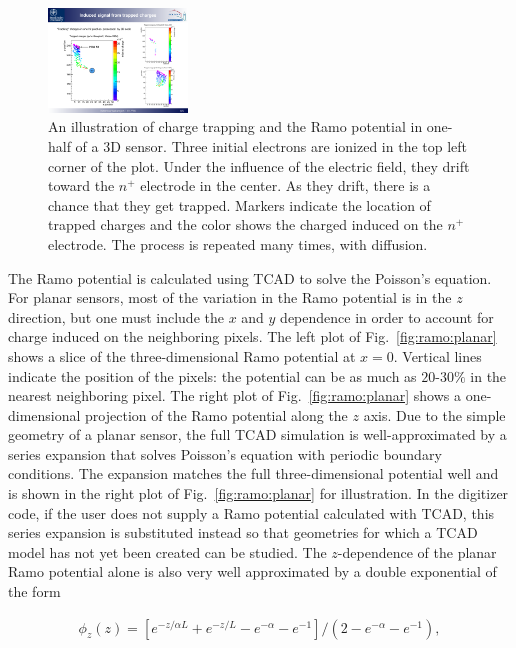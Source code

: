 \begin{figure}[!htpb]
\centering
\includegraphics[width=0.33\textwidth]{ramoschematic3D.pdf}
\caption{An illustration of charge trapping and the Ramo potential in one-half of a 3D sensor.  Three initial electrons are ionized in the top left corner of the plot.  Under the influence of the electric field, they drift toward the $n^+$ electrode in the center.  As they drift, there is a chance that they get trapped.  Markers indicate the location of trapped charges and the color shows the charged induced on the $n^+$ electrode.  The process is repeated many times, with diffusion.}
\label{fig:ramo:schematic}
\end{figure}

The Ramo potential is calculated using TCAD to solve the Poisson's equation.  For planar sensors, most of the variation in the Ramo potential is in the $z$ direction, but one must include the $x$ and $y$ dependence in order to account for charge induced on the neighboring pixels.  The left plot of Fig.~\ref{fig:ramo:planar} shows a slice of the three-dimensional Ramo potential at $x=0$.  Vertical lines indicate the position of the pixels: the potential can be as much as $20$-$30\%$ in the nearest neighboring pixel.  The right plot of Fig.~\ref{fig:ramo:planar} shows a one-dimensional projection of the Ramo potential along the $z$ axis.  Due to the simple geometry of a planar sensor, the full TCAD simulation is well-approximated by a series expansion that solves Poisson's equation with periodic boundary conditions.  The expansion matches the full three-dimensional potential well and is shown in the right plot of Fig.~\ref{fig:ramo:planar} for illustration.  In the digitizer code, if the user does not supply a Ramo potential calculated with TCAD, this series expansion is substituted instead so that geometries for which a TCAD model has not yet been created can be studied.  The $z$-dependence of the planar Ramo potential alone is also very well approximated by a double exponential of the form 

\begin{align}
\label{eq:doublexp}
\phi_z(z)=[e^{-z/\alpha L}+e^{-z/L}-e^{-\alpha}-e^{-1}]/(2-e^{-\alpha}-e^{-1}),
\end{align}

